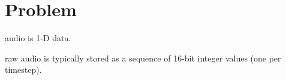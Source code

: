 \chapter{Problem}\label{chap:problem}

audio is 1-D data.\cite{oord_wavenet_2016}

raw audio is typically stored as a sequence of 16-bit integer values (one per timestep). \cite{oord_wavenet_2016}